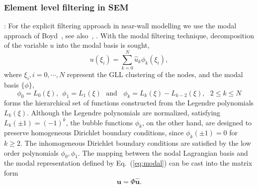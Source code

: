 \documentclass[times]{fldauth}
\begin{document}
\subsubsection{Element level filtering in SEM}\label{element_level}
\vspace{3 mm}
:\hspace{5mm} For the explicit filtering approach in near-wall modelling we use the modal approach of Boyd~\cite{boyd3}, see also~\cite{black}, \cite{bouf}. With the modal filtering technique, decomposition of the variable $u$ into the modal basis is sought,
\begin{equation}
u(\xi_i) = \sum_{k=0}^N{\hat{u}_k\phi_k(\xi_i)},\label{eq:modal}
\end{equation}
where $\xi_i, i = 0, \cdots, N$ represent the GLL clustering of the nodes, and the modal basis $\{\phi\}$,
\begin{equation}
\phi_0 = L_0(\xi),\ \ \phi_1 = L_1(\xi) \ \ \ \mbox{and}\ \ \ \ \phi_k = L_k(\xi) - L_{k-2}(\xi), \ \ \ 2\le k\le N  
\end{equation}
forms the hierarchical set of functions constructed from the Legendre polynomials $L_k(\xi)$. Although the Legendre polynomials are normalized, satisfying $L_k(\pm 1) = (-1)^k$, the bubble functions $\phi_k$, on the other hand, are designed to preserve homogeneous Dirichlet boundary conditions, since $\phi_k(\pm 1) = 0$ for $k\geq2$. The inhomogeneous Dirichlet boundary conditions are satisfied by the low order polynomials $\phi_0, \phi_1$. The mapping between the nodal Lagrangian basis and the modal representation defined by Eq.~(\ref{eq:modal}) can be cast into the matrix form\begin{equation}
\mathbf{u} = \Phi \mathbf{\hat{u}}.
\end{equation}
\end{document}
